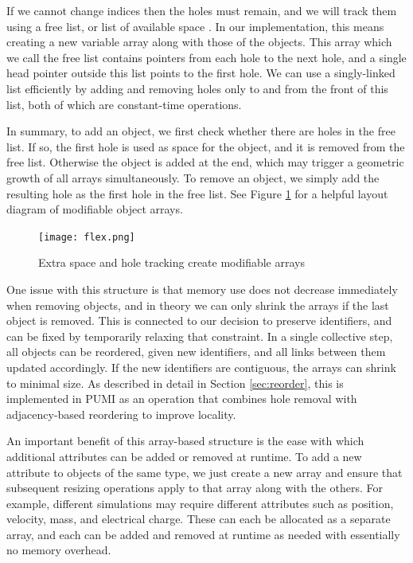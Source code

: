 If we cannot change indices then the holes must remain, and
we will track them using a free list, or list of available
space \cite{knuth1997list}.
In our implementation, this means creating a new variable array
along with those of the objects.
This array which we call the free list contains pointers
from each hole to the next hole,
and a single head pointer outside this list
points to the first hole.
We can use a singly-linked list efficiently by adding and
removing holes only to and from the front of this list,
both of which are constant-time operations.

In summary, to add an object, we first check whether there
are holes in the free list.
If so, the first hole is used as space for the object,
and it is removed from the free list.
Otherwise the object is added at the end,
which may trigger a geometric growth of all arrays
simultaneously.
To remove an object, we simply add the resulting hole as the first hole
in the free list.
See Figure \ref{fig:flex} for a helpful layout diagram
of modifiable object arrays.

\begin{figure}
\begin{center}
\texttt{[image: flex.png]}
\caption{Extra space and hole tracking create modifiable arrays}
\label{fig:flex}
\end{center}
\end{figure}

One issue with this structure is that memory use does
not decrease immediately when removing objects, and in theory we can
only shrink the arrays if the last object is removed.
This is connected to our decision to preserve identifiers,
and can be fixed by temporarily relaxing that constraint.
In a single collective step, all objects can be reordered,
given new identifiers, and all links between them updated
accordingly.
If the new identifiers are contiguous, the arrays can shrink
to minimal size.
As described in detail in Section \ref{sec:reorder},
this is implemented in PUMI as an operation that
combines hole removal with adjacency-based reordering
to improve locality.

An important benefit of this array-based structure is the
ease with which additional attributes can be added or removed
at runtime.
To add a new attribute to objects of the same type, we just
create a new array and ensure that subsequent resizing
operations apply to that array along with the others.
For example, different simulations may require different
attributes such as position, velocity, mass, and electrical charge.
These can each be allocated as a separate array,
and each can be added and removed at runtime as needed
with essentially no memory overhead.

